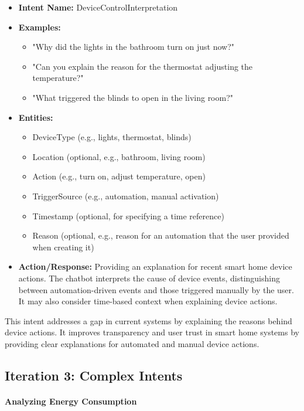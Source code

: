 \begin{itemize}
    \item \textbf{Intent Name:} DeviceControlInterpretation
    \item \textbf{Examples:}
    \begin{itemize}
        \item "Why did the lights in the bathroom turn on just now?"
        \item "Can you explain the reason for the thermostat adjusting the temperature?"
        \item "What triggered the blinds to open in the living room?"
    \end{itemize}
    \item \textbf{Entities:}
    \begin{itemize}
        \item DeviceType (e.g., lights, thermostat, blinds)
        \item Location (optional, e.g., bathroom, living room)
        \item Action (e.g., turn on, adjust temperature, open)
        \item TriggerSource (e.g., automation, manual activation)
        \item Timestamp (optional, for specifying a time reference)
        \item Reason (optional, e.g., reason for an automation that the user provided when creating it)
    \end{itemize}
    \item \textbf{Action/Response:} Providing an explanation for recent smart home device actions. The chatbot interprets the cause of device events, distinguishing between automation-driven events and those triggered manually by the user. It may also consider time-based context when explaining device actions.
\end{itemize}

This intent addresses a gap in current systems by explaining the reasons behind device actions. It improves transparency and user trust in smart home systems by providing clear explanations for automated and manual device actions.

\subsection{Iteration 3: Complex Intents}

\paragraph{Analyzing Energy Consumption}

